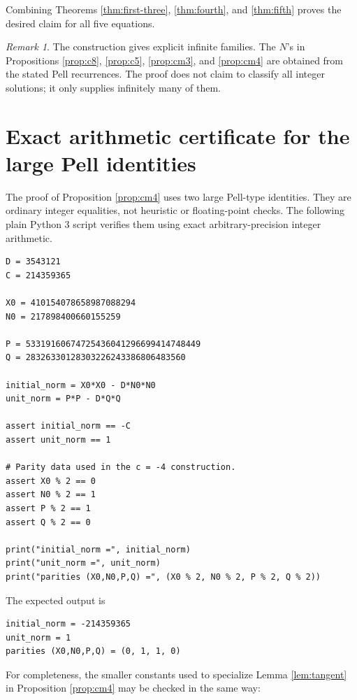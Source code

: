 \documentclass{article}
\theoremstyle{plain}
\theoremstyle{remark}
\newtheorem*{remark}{Remark}
\theoremstyle{myconjecture}
\theoremstyle{plain}
\theoremstyle{definition}
\numberwithin{equation}{section} %
\begin{document}
Combining Theorems \ref{thm:first-three}, \ref{thm:fourth}, and
\ref{thm:fifth} proves the desired claim for all five equations.

\begin{remark}
The construction gives explicit infinite families.  The \(N\)'s in Propositions
\ref{prop:c8}, \ref{prop:c5}, \ref{prop:cm3}, and \ref{prop:cm4} are obtained
from the stated Pell recurrences.  The proof does not claim to classify all
integer solutions; it only supplies infinitely many of them.
\end{remark}

\appendix
\section{Exact arithmetic certificate for the large Pell identities}

The proof of Proposition \ref{prop:cm4} uses two large Pell-type identities.
They are ordinary integer equalities, not heuristic or floating-point checks.
The following plain Python 3 script verifies them using exact arbitrary-precision
integer arithmetic.

\begin{lstlisting}[caption={Exact verification of the large Pell norm identities.}]
D = 3543121
C = 214359365

X0 = 410154078658987088294
N0 = 217898400660155259

P = 53319160674725436041296699414748449
Q = 28326330128303226243386806483560

initial_norm = X0*X0 - D*N0*N0
unit_norm = P*P - D*Q*Q

assert initial_norm == -C
assert unit_norm == 1

# Parity data used in the c = -4 construction.
assert X0 % 2 == 0
assert N0 % 2 == 1
assert P % 2 == 1
assert Q % 2 == 0

print("initial_norm =", initial_norm)
print("unit_norm =", unit_norm)
print("parities (X0,N0,P,Q) =", (X0 % 2, N0 % 2, P % 2, Q % 2))
\end{lstlisting}

The expected output is
\begin{lstlisting}
initial_norm = -214359365
unit_norm = 1
parities (X0,N0,P,Q) = (0, 1, 1, 0)
\end{lstlisting}

For completeness, the smaller constants used to specialize Lemma
\ref{lem:tangent} in Proposition \ref{prop:cm4} may be checked in the same way:
\end{document}
